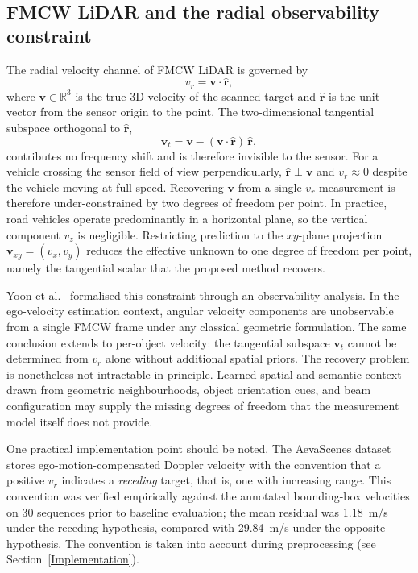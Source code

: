 \documentclass[a4paper,12pt]{article}
\begin{document}
\subsection{FMCW LiDAR and the radial observability constraint}

The radial velocity channel of FMCW LiDAR is governed by
\begin{equation}
    v_r = \mathbf{v} \cdot \hat{\mathbf{r}},
    \label{eq:doppler}
\end{equation}
where $\mathbf{v} \in \mathbb{R}^3$ is the true 3D velocity of the scanned target and $\hat{\mathbf{r}}$ is the unit vector from the sensor origin to the point. The two-dimensional tangential subspace orthogonal to $\hat{\mathbf{r}}$,
\begin{equation}
    \mathbf{v}_t = \mathbf{v} - (\mathbf{v} \cdot \hat{\mathbf{r}})\,\hat{\mathbf{r}},
    \label{eq:tangential_subspace}
\end{equation}
contributes no frequency shift and is therefore invisible to the sensor. For a vehicle crossing the sensor field of view perpendicularly, $\hat{\mathbf{r}} \perp \mathbf{v}$ and $v_r \approx 0$ despite the vehicle moving at full speed. Recovering $\mathbf{v}$ from a single $v_r$ measurement is therefore under-constrained by two degrees of freedom per point. In practice, road vehicles operate predominantly in a horizontal plane, so the vertical component $v_z$ is negligible. Restricting prediction to the $xy$-plane projection $\mathbf{v}_{xy} = (v_x, v_y)$ reduces the effective unknown to one degree of freedom per point, namely the tangential scalar that the proposed method recovers.

Yoon et al.~\cite{yoon2023needforspeed} formalised this constraint through an observability analysis. In the ego-velocity estimation context, angular velocity components are unobservable from a single FMCW frame under any classical geometric formulation. The same conclusion extends to per-object velocity: the tangential subspace $\mathbf{v}_t$ cannot be determined from $v_r$ alone without additional spatial priors. The recovery problem is nonetheless not intractable in principle. Learned spatial and semantic context drawn from geometric neighbourhoods, object orientation cues, and beam configuration may supply the missing degrees of freedom that the measurement model itself does not provide.

One practical implementation point should be noted. The AevaScenes dataset~\cite{aeva2025aevascenes} stores ego-motion-compensated Doppler velocity with the convention that a positive $v_r$ indicates a \textit{receding} target, that is, one with increasing range. This convention was verified empirically against the annotated bounding-box velocities on 30 sequences prior to baseline evaluation; the mean residual was 1.18~m/s under the receding hypothesis, compared with 29.84~m/s under the opposite hypothesis. The convention is taken into account during preprocessing (see Section~\ref{Implementation}).
\end{document}
